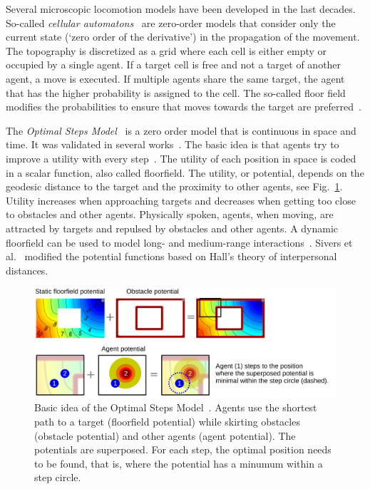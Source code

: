 Several microscopic locomotion models have been developed in the last decades.
So-called \textit{cellular automatons}~\cite{gipps-1985-cdyn} are zero-order models that consider only the current state (`zero order of the derivative') in the propagation of the movement. The topography is discretized as a grid where each cell is either empty or occupied by a single agent. If a target cell is free and not a target of another agent, a move is executed. If multiple agents share the same target, the agent that has the higher probability is assigned to the cell. The so-called floor field modifies the probabilities to ensure that moves towards the target are preferred~\cite{kirik-2007-cdyn,schadschneider-2001-cdyn}.  

The \textit{Optimal Steps Model}~\cite{seitz-2012-cdyn} is a zero order model that is continuous in space and time. It was validated in several works~\cite{seitz-2016c-cdyn,seer-2015-cs,seitz-2012-cdyn,sivers-2016b-cdyn}. The basic idea is that agents try to improve a utility with every step~\cite{seitz-2012-cdyn}. The utility of each position in space is coded in a scalar function, also called floorfield. The utility, or potential, depends on the geodesic distance to the target and the proximity to other agents, see Fig.~\ref{fig:floorfield}. Utility increases when approaching targets and decreases when getting too close to obstacles and other agents. Physically spoken, agents, when moving, are attracted by targets and repulsed by obstacles and other agents. A dynamic floorfield can be used to model long- and medium-range interactions~\cite{koster-2014b-cdyn}. Sivers et al.~\cite{sivers-2015-cdyn} modified the potential functions based on Hall's theory of interpersonal distances. 





\begin{figure}[hbt!]
\centering
\includegraphics[width=1\textwidth]{../figures/state-of-the-art/crowds/optimalstepsmodel.pdf} 
\caption[Idea of the Optimal Steps Model]{Basic idea of the Optimal Steps Model~\cite{seitz-2012-cdyn}. Agents use the shortest path to a target (floorfield potential) while skirting obstacles (obstacle potential) and other agents (agent potential). The potentials are superposed. 
For each step, the optimal position needs to be found, that is, where the potential has a minumum within a step circle. }
\label{fig:floorfield}
\end{figure}



